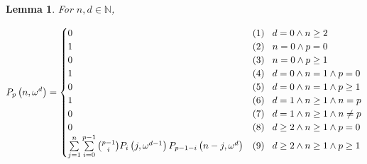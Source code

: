 \documentclass[10pt,a4paper]{article}
\newcommand{\om}{\omega}
\newcommand{\N}{\mathbb{N}}
\newcommand{\numpoints}{n}
\theoremstyle{plain}
\newtheorem{lemma}[theorem]{Lemma}
\theoremstyle{definition}
\begin{document}
\begin{lemma}
\label{le:P-recur}
For $\numpoints,d \in \N$,


\[
P_p\left( \numpoints,\om^d\right) = \begin{cases}
    0 & \textnormal{(1)\phantom{0} } d = 0 \land \numpoints \geq 2\\
    1 & \textnormal{(2)\phantom{0} } \numpoints = 0 \land p = 0\\
    0 & \textnormal{(3)\phantom{0} } \numpoints = 0 \land p \geq 1\\
    1 & \textnormal{(4)\phantom{0} } d = 0 \land \numpoints = 1 \land p = 0\\
    0 & \textnormal{(5)\phantom{0} } d = 0 \land \numpoints = 1 \land p \geq 1\\
    1 & \textnormal{(6)\phantom{0} } d = 1 \land \numpoints \geq 1 \land \numpoints = p\\
    0 & \textnormal{(7)\phantom{0} } d = 1 \land \numpoints \geq 1 \land \numpoints \neq p\\
    0 & \textnormal{(8)\phantom{0} } d \geq 2 \land \numpoints \geq 1 \land p = 0\\
    \sum\limits_{j=1}^\numpoints \sum\limits_{i=0}^{p-1} \binom{p-1}{i} P_i \left( j,\om^{d-1} \right) P_{p-1-i} \left( \numpoints-j,\om^d\right) & \textnormal{(9)\phantom{0} } d \geq 2 \land \numpoints \geq 1 \land p \geq 1
\end{cases}
\]

\end{lemma}
\end{document}
